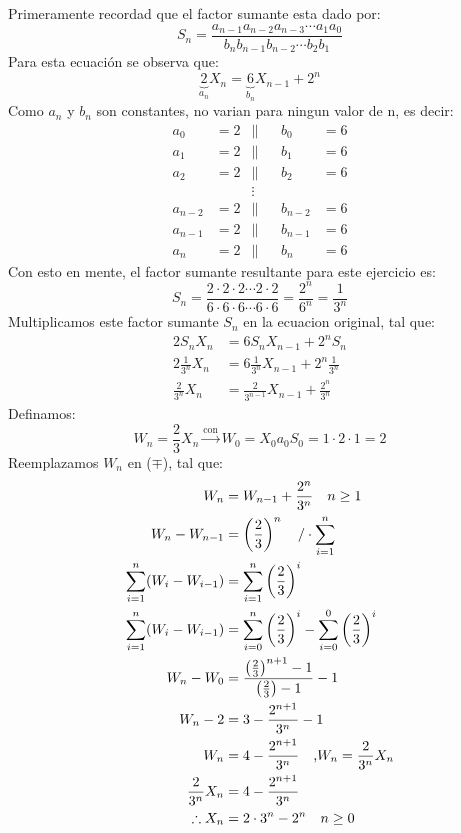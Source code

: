 
\begin{solution}
Primeramente recordad que el factor sumante esta dado por:
$$S_n= \frac{a_{n-1}a_{n-2}a_{n-3}\cdots a_1a_0}{b_nb_{n-1}b_{n-2}\cdots b_2b_1}$$
Para esta ecuación se observa que:
$$\underbrace{2}_{a_n}X_n = \underbrace{6}_{b_n}X_{n-1}+2^n$$
Como $a_n$ y $b_n$ son constantes, no varian para ningun valor de n, es decir:
\begin{align*}
    a_0&=2 &\|& &b_0&=6 \\
    a_1&=2 &\|& &b_1&=6 \\
    a_2&=2 &\|& &b_2&=6 \\
    &&\vdots&&&\\
    a_{n-2}&=2 &\|& &b_{n-2}&=6 \\
    a_{n-1}&=2 &\|& &b_{n-1}&=6 \\
    a_n &=2 &\|& &b_n&=6
\end{align*}
Con esto en mente, el factor sumante resultante para este ejercicio es:
$$S_n = \frac{2\cdot2\cdot2\cdots2\cdot2}{6\cdot6\cdot6\cdots6\cdot6}=\frac{2^n}{6^n}=\frac{1}{3^n}$$
Multiplicamos este factor sumante $S_n$ en la ecuacion original, tal que:
\begin{align*}
    2S_nX_n &= 6S_nX_{n-1}+2^nS_n \\
    2\frac{1}{3^n}X_n &= 6\frac{1}{3^n}X_{n-1}+2^n\frac{1}{3^n} \\
    \frac{2}{3^n}X_n &= \frac{2}{3^{n-1}}X_{n-1}+\frac{2^n}{3^n} \tag{$\mp$}
\end{align*}
Definamos:
$$W_n = \frac{2}{3}X_n \xrightarrow{\text{con}} W_0 = X_0a_0S_0 =1\cdot2\cdot1=2$$
Reemplazamos $W_n$ en ($\mp$), tal que:
\begin{align*}
    W_n &= W_{n-1}+\frac{2^n}{3^n} \quad n \ge 1\\
    W_n- W_{n-1} &= \left(\frac{2}{3}\right)^n \quad \text{/}\cdot\sum\limits_{i=1}^{n} \\
    \sum\limits_{i=1}^{n}(W_i - W_{i-1}) &=\sum\limits_{i=1}^{n} \left(\frac{2}{3}\right)^i \\
    \sum\limits_{i=1}^{n}(W_i - W_{i-1}) &=\sum\limits_{i=0}^{n} \left(\frac{2}{3}\right)^i-\sum\limits_{i=0}^{0} \left(\frac{2}{3}\right)^i \\
    W_n - W_0 &= \frac{\left(\frac{2}{3}\right)^{n+1}-1}{\left(\frac{2}{3}\right)-1} -1\\
    W_n - 2 &= 3 - \frac{2^{n+1}}{3^n} -1\\
    W_n &= 4 - \frac{2^{n+1}}{3^n} \quad \text{,} W_n = \frac{2}{3^n}X_n\\
    \frac{2}{3^n}X_n  &= 4 - \frac{2^{n+1}}{3^n} \\
    \therefore X_n  &= 2\cdot3^n -2^n \quad n\ge 0\\
\end{align*}
\end{solution}